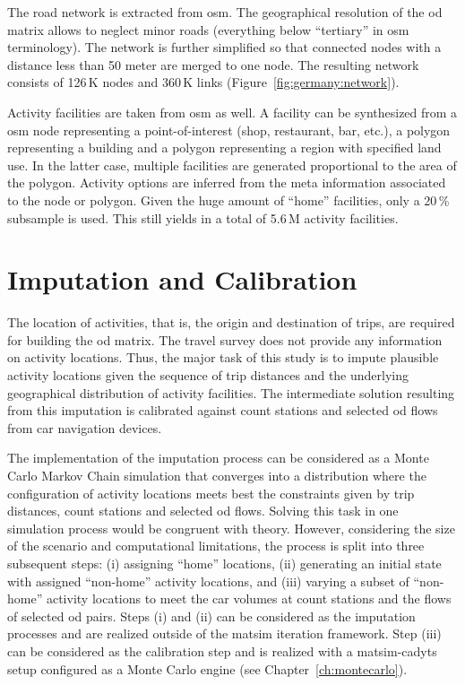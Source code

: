 The road network is extracted from \gls{osm}. The geographical resolution of the \gls{od} matrix allows to neglect minor roads (everything below ``tertiary'' in \gls{osm} terminology). The network is further simplified so that connected nodes with a distance less than 50 meter are merged to one node. The resulting network consists of 126\,K nodes and 360\,K links (Figure~\ref{fig:germany:network}).

Activity facilities are taken from \gls{osm} as well. A facility can be synthesized from a \gls{osm} node representing a point-of-interest (shop, restaurant, bar, etc.), a polygon representing a building and a polygon representing a region with specified land use. In the latter case, multiple facilities are generated proportional to the area of the polygon. Activity options are inferred from the meta information associated to the node or polygon. Given the huge amount of ``home'' facilities, only a 20\,\% subsample is used. This still yields in a total of 5.6\,M activity facilities.

\section{Imputation and Calibration}

The location of activities, that is, the origin and destination of trips, are required for building the \gls{od} matrix. The travel survey does not provide any information on activity locations. Thus, the major task of this study is to impute plausible activity locations given the sequence of trip distances and the underlying geographical distribution of activity facilities. The intermediate solution resulting from this imputation is calibrated against count stations and selected \gls{od} flows from car navigation devices.

The implementation of the imputation process can be considered as a Monte Carlo Markov Chain simulation that converges into a distribution where the configuration of activity locations meets best the constraints given by trip distances, count stations and selected \gls{od} flows. Solving this task in one simulation process would be congruent with theory. However, considering the size of the scenario and computational limitations, the process is split into three subsequent steps: (i) assigning ``home'' locations, (ii) generating an initial state with assigned ``non-home'' activity locations, and (iii) varying a subset of ``non-home'' activity locations to meet the car volumes at count stations and the flows of selected \gls{od} pairs. Steps (i) and (ii) can be considered as the imputation processes and are realized outside of the \gls{matsim} iteration framework. Step (iii) can be considered as the calibration step and is realized with a \gls{matsim}-\gls{cadyts} setup configured as a Monte Carlo engine (see Chapter~\ref{ch:montecarlo}).

